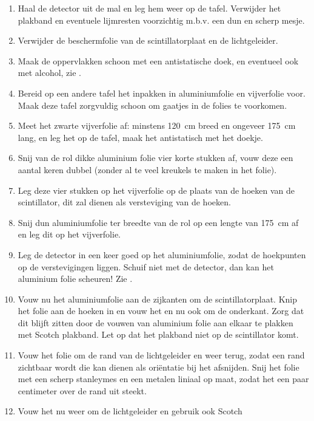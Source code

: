 \begin{enumerate}
    \item Haal de detector uit de mal en leg hem weer op de tafel.
    Verwijder het plakband en eventuele lijmresten voorzichtig m.b.v.
    een dun en scherp mesje.
    \item Verwijder de beschermfolie van de scintillatorplaat en de
    lichtgeleider.
    \item Maak de oppervlakken schoon met een antistatische doek, en
    eventueel ook met alcohol, zie .
    \item Bereid op een andere tafel het inpakken in aluminiumfolie en
    vijverfolie voor. Maak deze tafel zorgvuldig schoon om gaatjes in de
    folies te voorkomen.
    \item Meet het zwarte vijverfolie af: minstens
    \SI{120}{\centi\meter} breed en ongeveer \SI{175}{\centi\meter}
    lang, en leg het op de tafel, maak het antistatisch met het doekje.
    \item Snij van de rol dikke aluminium folie vier korte stukken af,
    vouw deze een aantal keren dubbel (zonder al te veel kreukels te
    maken in het folie).
    \item Leg deze vier stukken op het vijverfolie op de plaats van de
    hoeken van de scintillator, dit zal dienen als versteviging van de
    hoeken.
    \item Snij dun aluminiumfolie ter breedte van de rol op een lengte
    van \SI{175}{\centi\meter} af en leg dit op het vijverfolie.
    \item Leg de detector in een keer goed op het aluminiumfolie, zodat
    de hoekpunten op de verstevigingen liggen. Schuif niet met de
    detector, dan kan het aluminium folie scheuren! Zie
    .
    \item Vouw nu het aluminiumfolie aan de zijkanten om de
    scintillatorplaat. Knip het folie aan de hoeken in en vouw het en nu
    ook om de onderkant. Zorg dat dit blijft zitten door de vouwen van
    aluminium folie aan elkaar te plakken met Scotch plakband. Let op
    dat het plakband niet op de scintillator komt.
    \item Vouw het folie om de rand van de lichtgeleider en weer terug,
    zodat een rand zichtbaar wordt die kan dienen als oriëntatie bij
    het afsnijden. Snij het folie met een scherp stanleymes en een
    metalen liniaal op maat, zodat het een paar centimeter over de rand
    uit steekt.
    \item Vouw het nu weer om de lichtgeleider en gebruik ook Scotch

\end{enumerate}
